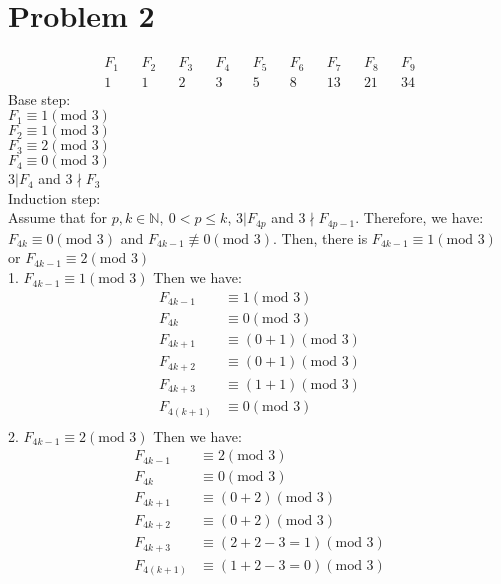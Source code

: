 \documentclass{article}
\begin{document}
\section*{Problem 2}
\begin{align*}
    F_1&&F_2&&F_3&&F_4&&F_5&&F_6&&F_7&&F_8&&F_9\\
    1&&1&&2&&3&&5&&8&&13&&21&&34
\end{align*}
Base step:\\
    \(F_1\equiv1(\text{mod }3)\)\\
    \(F_2\equiv1(\text{mod }3)\)\\
    \(F_3\equiv2(\text{mod }3)\)\\
    \(F_4\equiv0(\text{mod }3)\)\\
    \(3|F_4\) and \(3\nmid F_{3}\)\\
Induction step:\\
    Assume that for \(p,k\in \mathbb {N},\ 0<p\leqslant k\), \(3|F_{4p}\) and \(3\nmid F_{4p-1}\).
    Therefore, we have:\\
     \(F_{4k}\equiv0(\text{mod }3)\) and \(F_{4k-1}\not\equiv0(\text{mod }3)\).
     Then, there is \(F_{4k-1}\equiv1(\text{mod }3)\) or \(F_{4k-1}\equiv2(\text{mod }3)\)\\
1. \(F_{4k-1}\equiv 1 (\text{mod }3)\)
    Then we have:
    \begin{align*}
        F_{4k-1} &\equiv 1 (\text{mod }3)\\
        F_{4k} &\equiv 0 (\text{mod }3)\\
        F_{4k+1} &\equiv (0+1) (\text{mod }3)\\
        F_{4k+2} &\equiv (0+1) (\text{mod }3)\\
        F_{4k+3} &\equiv (1+1) (\text{mod }3)\\
        F_{4(k+1)}&\equiv 0 (\text{mod }3)\\
    \end{align*}
2. \(F_{4k-1}\equiv 2 (\text{mod }3)\)
    Then we have:
    \begin{align*}
        F_{4k-1} &\equiv 2 (\text{mod }3)\\
        F_{4k} &\equiv 0 (\text{mod }3)\\
        F_{4k+1} &\equiv (0+2) (\text{mod }3)\\
        F_{4k+2} &\equiv (0+2) (\text{mod }3)\\
        F_{4k+3} &\equiv (2+2-3=1) (\text{mod }3)\\
        F_{4(k+1)}&\equiv (1+2-3=0) (\text{mod }3)\\
    \end{align*}
\end{document}
